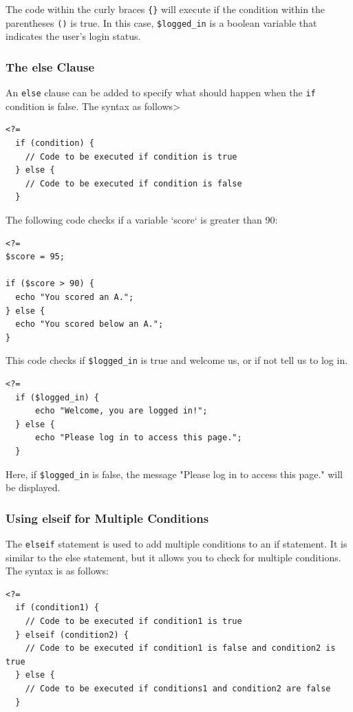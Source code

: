 \documentclass[11pt]{article}
\begin{document}
The code within the curly braces \texttt{\{\}} will execute if the condition
within the parentheses \texttt{()} is true. In this case, \texttt{\$logged\_in} is a
boolean variable that indicates the user's login status.

\subsubsection{The else Clause}
\label{sec:org0d7dcd2}
An \texttt{else} clause can be added to specify what should happen when the
\texttt{if} condition is false. The syntax as follows>
\begin{verbatim}
<?=
  if (condition) {
    // Code to be executed if condition is true
  } else {
    // Code to be executed if condition is false
  }
\end{verbatim}

The following code checks if a variable `score` is greater than 90:
\begin{verbatim}
<?=
$score = 95;

if ($score > 90) {
  echo "You scored an A.";
} else {
  echo "You scored below an A.";
}
\end{verbatim}

This code checks if \texttt{\$logged\_in} is true and welcome us, or if not
tell us to log in.
\begin{verbatim}
<?=
  if ($logged_in) {
      echo "Welcome, you are logged in!";
  } else {
      echo "Please log in to access this page.";
  }
\end{verbatim}

Here, if \texttt{\$logged\_in} is false, the message "Please log in to access
this page." will be displayed.

\subsubsection{Using elseif for Multiple Conditions}
\label{sec:org3c53723}
 The \texttt{elseif} statement is used to add multiple conditions to an if
statement. It is similar to the else statement, but it allows you to
check for multiple conditions. The syntax is as follows:
\begin{verbatim}
<?=
  if (condition1) {
    // Code to be executed if condition1 is true
  } elseif (condition2) {
    // Code to be executed if condition1 is false and condition2 is true
  } else {
    // Code to be executed if conditions1 and condition2 are false
  }
\end{verbatim}
\end{document}
